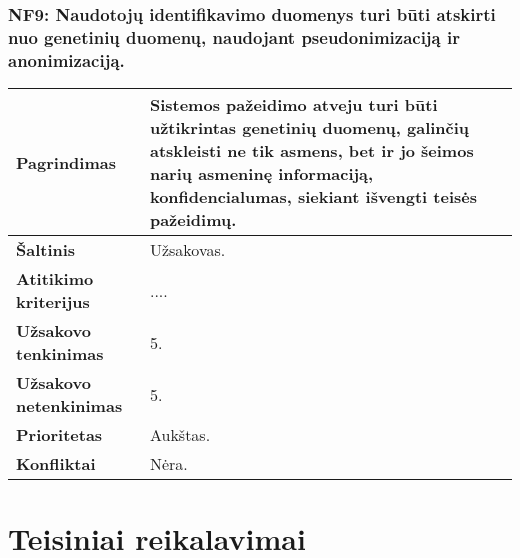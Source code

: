 \documentclass[12pt]{article}
\begin{document}
\subsubsection*{NF9: Naudotojų identifikavimo duomenys turi būti atskirti nuo
genetinių duomenų, naudojant pseudonimizaciją ir anonimizaciją.}
\label{sec:NF9}
\begin{table}[htb!]
    \captionsetup{justification=centering}
    \begin{tabular}{|m{4.9cm}|m{11cm}|}
        \hline
        \raggedleft \textbf{\cellcolor{orange!30}Pagrindimas} &
        Sistemos pažeidimo atveju turi būti užtikrintas genetinių duomenų,
        galinčių atskleisti ne tik asmens, bet ir jo šeimos narių asmeninę
        informaciją, konfidencialumas, siekiant išvengti teisės pažeidimų. \\
        \hline
        \raggedleft \textbf{\cellcolor{orange!30}Šaltinis} & Užsakovas. \\
        \hline
        \raggedleft \textbf{\cellcolor{orange!30}Atitikimo kriterijus} & 
        .... \\
        \hline
        \raggedleft \textbf{\cellcolor{orange!30}Užsakovo tenkinimas} & 5. \\
        \hline
        \raggedleft \textbf{\cellcolor{orange!30}Užsakovo netenkinimas} & 5. \\
        \hline
        \raggedleft \textbf{\cellcolor{orange!30}Prioritetas} & Aukštas. \\
        \hline
        \raggedleft \textbf{\cellcolor{orange!30}Konfliktai} & Nėra. \\
        \hline
    \end{tabular}
\end{table}


\section{Teisiniai reikalavimai}
\end{document}
